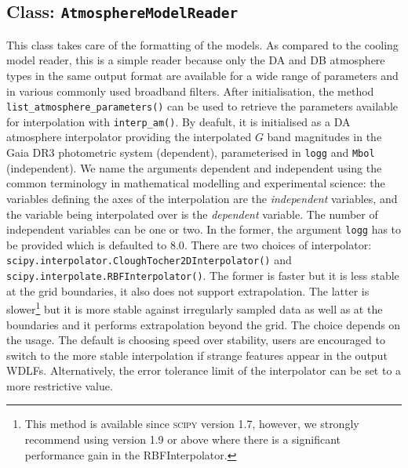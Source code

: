 \documentclass[fleqn,usenatbib]{rasti}
\begin{document}
\subsection{Class: \texttt{AtmosphereModelReader}}
This class takes care of the formatting of the models. As compared to the
cooling model reader, this is a simple reader because only the DA and DB
atmosphere types in the same output format are available for a wide range of
parameters and in various commonly used broadband filters. After initialisation,
the method \verb+list_atmosphere_parameters()+ can be used to retrieve the
parameters available for interpolation with \verb+interp_am()+. By deafult, it
is initialised as a DA atmosphere interpolator providing the interpolated $G$
band magnitudes in the Gaia DR3 photometric system (dependent), parameterised
in \verb+logg+ and \verb+Mbol+ (independent). We name the arguments dependent
and independent using the common terminology in mathematical modelling and
experimental science: the variables defining the axes of the interpolation are
the \textit{independent} variables, and the variable being interpolated over
is the \textit{dependent} variable. The number of independent variables can be
one or two. In the former, the argument \verb+logg+ has to be provided which
is defaulted to $8.0$. There are two choices of interpolator:
\verb+scipy.interpolator.CloughTocher2DInterpolator()+ and 
\verb+scipy.interpolate.RBFInterpolator()+. The former is faster but it is less
stable at the grid boundaries, it also does not support extrapolation. The
latter is slower\footnote{This method is available since \textsc{scipy}
version 1.7, however, we strongly recommend using version 1.9 or above where
there is a significant performance gain in the RBFInterpolator.} but it is more
stable against irregularly sampled data as well as at the boundaries and it
performs extrapolation beyond the grid. The choice depends on the usage. The
default is choosing speed over stability, users are encouraged to switch to
the more stable interpolation if strange features appear in the output WDLFs.
Alternatively, the error tolerance limit of the interpolator can be set to a
more restrictive value.
\end{document}
